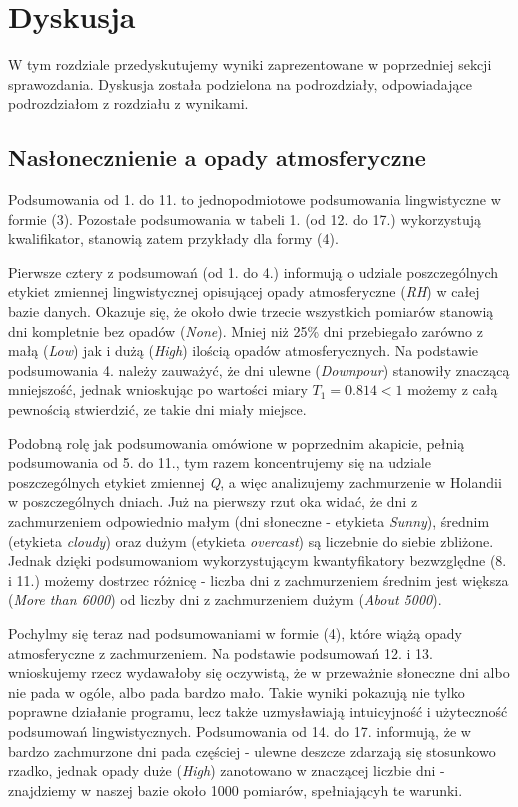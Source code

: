 \documentclass{classrep}
\begin{document}
\clearpage

\section{Dyskusja}

W tym rozdziale przedyskutujemy wyniki zaprezentowane w poprzedniej sekcji sprawozdania. Dyskusja została podzielona na podrozdziały, odpowiadające podrozdziałom z rozdziału z wynikami. \newline


\subsection{Nasłonecznienie a opady atmosferyczne}
Podsumowania od 1. do 11. to jednopodmiotowe podsumowania lingwistyczne w formie (3). Pozostałe podsumowania w tabeli 1. (od 12. do 17.) wykorzystują kwalifikator, stanowią zatem przykłady dla formy (4).\newline

Pierwsze cztery z podsumowań (od 1. do 4.) informują o udziale poszczególnych etykiet zmiennej lingwistycznej opisującej opady atmosferyczne (\textit{RH}) w całej bazie danych. Okazuje się, że około dwie trzecie wszystkich pomiarów stanowią dni kompletnie bez opadów (\textit{None}). Mniej niż 25\% dni przebiegało zarówno z małą  (\textit{Low}) jak i dużą  (\textit{High}) ilością opadów atmosferycznych. Na podstawie podsumowania 4. należy zauważyć, że dni ulewne  (\textit{Downpour}) stanowiły znaczącą mniejszość, jednak wnioskując po wartości miary $T_1 = 0.814 < 1$ możemy z całą pewnością stwierdzić, ze takie dni miały miejsce.\newline

Podobną rolę jak podsumowania omówione w poprzednim akapicie, pełnią podsumowania od 5. do 11., tym razem koncentrujemy się na udziale poszczególnych etykiet zmiennej \textit{Q}, a więc analizujemy zachmurzenie w Holandii w poszczególnych dniach. Już na pierwszy rzut oka widać, że dni z zachmurzeniem odpowiednio małym (dni słoneczne - etykieta \textit{Sunny}), średnim (etykieta \textit{cloudy}) oraz dużym (etykieta \textit{overcast}) są liczebnie do siebie zbliżone. Jednak dzięki podsumowaniom wykorzystującym kwantyfikatory bezwzględne (8. i 11.) możemy dostrzec różnicę - liczba dni z zachmurzeniem średnim jest większa (\textit{More than 6000}) od liczby dni z zachmurzeniem dużym (\textit{About 5000}).\newline

Pochylmy się teraz nad podsumowaniami w formie (4), które wiążą opady atmosferyczne z zachmurzeniem. Na podstawie podsumowań 12. i 13. wnioskujemy rzecz wydawałoby się oczywistą, że w przeważnie słoneczne dni albo nie pada w ogóle, albo pada bardzo mało. Takie wyniki pokazują nie tylko poprawne działanie programu, lecz także uzmysławiają intuicyjność i użyteczność podsumowań lingwistycznych. Podsumowania od 14. do 17. informują, że w bardzo zachmurzone dni pada częściej - ulewne deszcze zdarzają się stosunkowo rzadko, jednak opady duże (\textit{High}) zanotowano w znaczącej liczbie dni - znajdziemy w naszej bazie około 1000 pomiarów, spełniającyh te warunki.\newline
\end{document}
